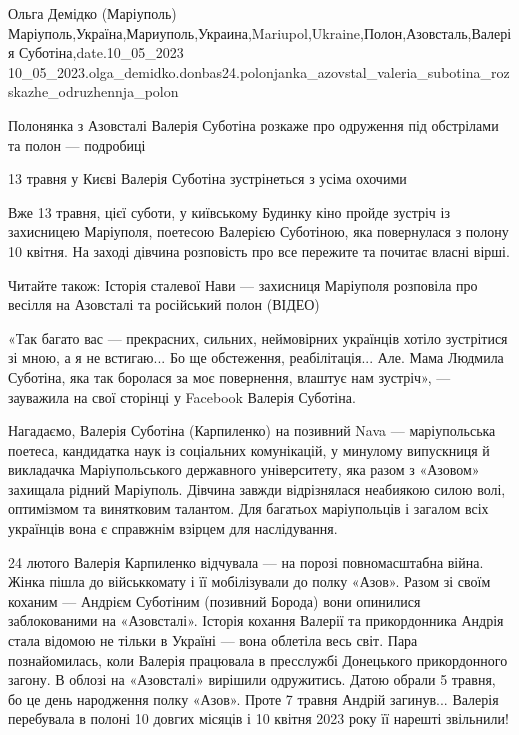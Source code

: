  
 
 
 
 

Ольга Демідко (Маріуполь)
Маріуполь,Україна,Мариуполь,Украина,Mariupol,Ukraine,Полон,Азовсталь,Валерія Суботіна,date.10_05_2023
10_05_2023.olga_demidko.donbas24.polonjanka_azovstal_valeria_subotina_rozskazhe_odruzhennja_polon

Полонянка з Азовсталі Валерія Суботіна розкаже про одруження під обстрілами та полон — подробиці

13 травня у Києві Валерія Суботіна зустрінеться з усіма охочими

Вже 13 травня, цієї суботи, у київському Будинку кіно пройде зустріч із
захисницею Маріуполя, поетесою Валерією Суботіною, яка повернулася з полону 10
квітня. На заході дівчина розповість про все пережите та почитає власні вірші.

Читайте також: Історія сталевої Нави — захисниця Маріуполя розповіла про
весілля на Азовсталі та російський полон (ВІДЕО)

«Так багато вас — прекрасних, сильних, неймовірних українців хотіло зустрітися
зі мною, а я не встигаю... Бо ще обстеження, реабілітація... Але. Мама Людмила
Суботіна, яка так боролася за моє повернення, влаштує нам зустріч», — зауважила
на свої сторінці у Facebook Валерія Суботіна.

Нагадаємо, Валерія Суботіна (Карпиленко) на позивний Nava — маріупольська
поетеса, кандидатка наук із соціальних комунікацій, у минулому випускниця й
викладачка Маріупольського державного університету, яка разом з «Азовом»
захищала рідний Маріуполь. Дівчина завжди відрізнялася неабиякою силою волі,
оптимізмом та винятковим талантом. Для багатьох маріупольців і загалом всіх
українців вона є справжнім взірцем для наслідування.

24 лютого Валерія Карпиленко відчувала — на порозі повномасштабна війна. Жінка
пішла до військкомату і її мобілізували до полку «Азов». Разом зі своїм коханим
— Андрієм Суботіним (позивний Борода) вони опинилися заблокованими на
«Азовсталі». Історія кохання Валерії та прикордонника Андрія стала відомою не
тільки в Україні — вона облетіла весь світ. Пара познайомилась, коли Валерія
працювала в пресслужбі Донецького прикордонного загону. В облозі на «Азовсталі»
вирішили одружитись. Датою обрали 5 травня, бо це день народження полку «Азов».
Проте 7 травня Андрій загинув... Валерія перебувала в полоні 10 довгих місяців і
10 квітня 2023 року її нарешті звільнили!

